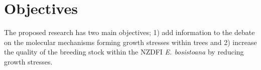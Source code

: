 \chapter{Objectives}
The proposed research has two main objectives; 1) add information to the
debate on the molecular mechanisms forming growth stresses within trees and 2)
increase the quality of the breeding stock within the NZDFI \textit{E.
bosistoana} by reducing growth stresses.